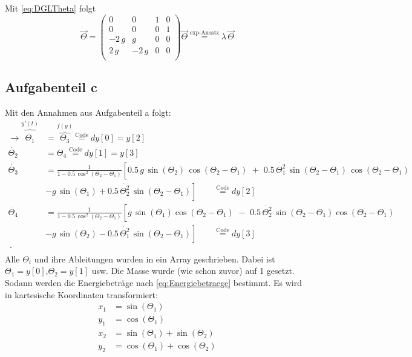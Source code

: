 Mit \ref{eq:DGLTheta} folgt
\begin{equation*}
	\dot{\vec{\Theta}} = 
	\begin{pmatrix}
		0 & 0 & 1 & 0 \\
		0 & 0 & 0 & 1 \\
		-2\,g & g & 0 & 0 \\
		2\,g & -2\,g & 0 & 0 \\
	\end{pmatrix}
	\vec{\Theta} \stackrel{\text{exp-Ansatz}}{=} \lambda\, \vec{\Theta}
\end{equation*} 

\subsection*{Aufgabenteil c}
Mit den Annahmen aus Aufgabenteil a folgt:
\begin{equation*}
  \begin{split}
  	\rightarrow \overbrace{\dot{\Theta_1}}^{y'(t)} &= \overbrace{\Theta_3}^{f(y)} \stackrel{\text{Code}}{=} dy[0] = y[2]\\
  	\dot{\Theta_2} &= \Theta_4 \stackrel{\text{Code}}{=} dy[1] = y[3] \\
  	\dot{\Theta_3} &= \frac{1}{1-0.5\,\cos^2(\Theta_2-\Theta_1)} \left[ 0.5\,g\,\sin(\Theta_2)\,\cos(\Theta_2-\Theta_1)\,\, + \,\, 0.5\,\dot{\Theta_1^2}\,\sin(\Theta_2-\Theta_1)\,\cos(\Theta_2-\Theta_1)\right.  \\
  	&\left.-g\,\sin(\Theta_1)+ 0.5\, \dot{\Theta_2^2}\,\sin(\Theta_2-\Theta_1)\right] \qquad \stackrel{\text{Code}}{=}  dy[2]\\
  	\dot{\Theta_4} &= \frac{1}{1-0.5\,\cos^2(\Theta_2-\Theta_1)}\left[g\,\sin(\Theta_1)\cos(\Theta_2-\Theta_1)\,\,-\,\,0.5\,\dot{\Theta_2^2}\,\sin(\Theta_2-\Theta_1)\cos(\Theta_2-\Theta_1)\right. \\
		&\left.-g\,\sin(\Theta_2)-0.5\,\dot{\Theta_1^2}\,\sin(\Theta_2-\Theta_1)\right]\qquad \stackrel{\text{Code}}{=}  dy[3]\\\,. \\
  \end{split}
\end{equation*}
Alle $\Theta_i$ und ihre Ableitungen wurden in ein Array geschrieben. Dabei ist $\Theta_1 = y[0]$,$\Theta_2 = y[1]$ usw. Die Masse wurde (wie schon zuvor) auf 1 gesetzt. Sodann werden die Energiebeträge nach \eqref{eq:Energiebetraege} bestimmt. Es wird in kartesische Koordinaten transformiert:
\begin{equation}
 	\begin{split}
 		x_1 &= \sin(\Theta_1) \\
 		y_1 &= \cos(\Theta_1) \\
 		x_2 &= \sin(\Theta_1)+\sin(\Theta_2) \\
 		y_2 &= \cos(\Theta_1)+\cos(\Theta_2) \\ 		
 	\end{split}
 	\label{eq:kartKords}
\end{equation}
